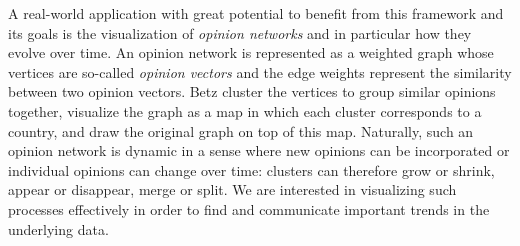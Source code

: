 A real-world application with great potential to benefit from this framework and its goals is the visualization of \emph{opinion networks} \cite{betz2019applying} and in particular how they evolve over time. An opinion network is represented as a weighted graph whose vertices are so-called \emph{opinion vectors} and the edge weights represent the similarity between two opinion vectors. Betz \etal{} cluster the vertices to group similar opinions together, visualize the graph as a map in which each cluster corresponds to a country, and draw the original graph on top of this map. Naturally, such an opinion network is dynamic in a sense where new opinions can be incorporated or individual opinions can change over time: clusters can therefore grow or shrink, appear or disappear, merge or split. We are interested in visualizing such processes effectively in order to find and communicate important trends in the underlying data.
